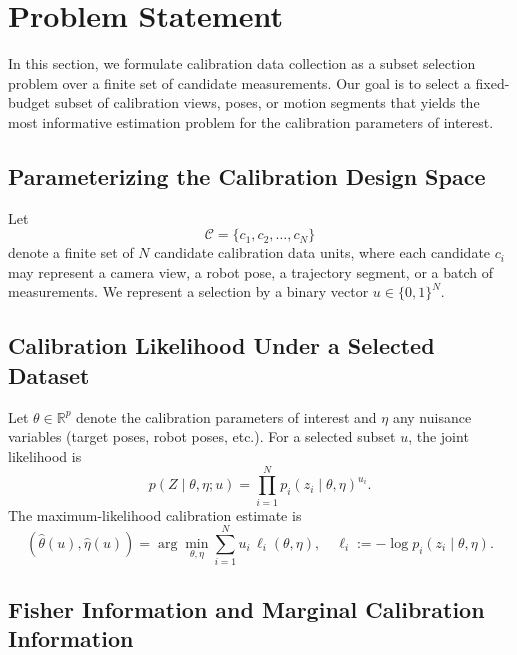 \documentclass[11pt]{article}
\begin{document}
\section{Problem Statement}

In this section, we formulate calibration data collection as a subset
selection problem over a finite set of candidate measurements.
Our goal is to select a fixed-budget subset of calibration views, poses, or
motion segments that yields the most informative estimation problem for the
calibration parameters of interest.

\subsection{Parameterizing the Calibration Design Space}

Let
\begin{equation}
\mathcal{C} = \{c_1, c_2, \dots, c_N\}
\end{equation}
denote a finite set of $N$ candidate calibration data units, where each
candidate $c_i$ may represent a camera view, a robot pose, a trajectory
segment, or a batch of measurements.
We represent a selection by a binary vector $u \in \{0,1\}^N$.

\subsection{Calibration Likelihood Under a Selected Dataset}

Let $\theta \in \mathbb{R}^p$ denote the calibration parameters of interest
and $\eta$ any nuisance variables (target poses, robot poses, etc.).
For a selected subset $u$, the joint likelihood is
\begin{equation}
p(Z \mid \theta,\eta;u)
= \prod_{i=1}^{N} p_i(z_i \mid \theta,\eta)^{u_i}.
\end{equation}
The maximum-likelihood calibration estimate is
\begin{equation}
(\hat{\theta}(u),\hat{\eta}(u))
= \arg\min_{\theta,\eta} \sum_{i=1}^{N} u_i \, \ell_i(\theta,\eta),
\quad
\ell_i := -\log p_i(z_i \mid \theta,\eta).
\end{equation}

\subsection{Fisher Information and Marginal Calibration Information}
\end{document}

